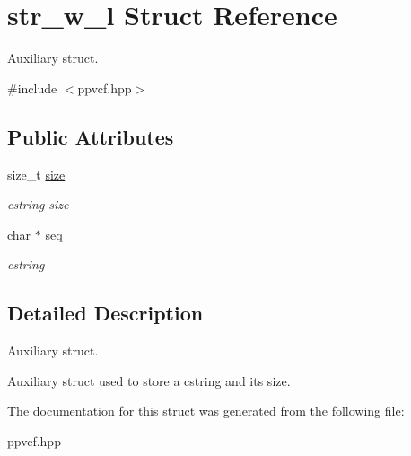 \hypertarget{structstr__w__l}{}\section{str\+\_\+w\+\_\+l Struct Reference}
\label{structstr__w__l}


Auxiliary struct.  




{\ttfamily \#include $<$ppvcf.\+hpp$>$}

\subsection*{Public Attributes}
\begin{DoxyCompactItemize}
\item 
\mbox{\label{structstr__w__l_afde6b57845c40c7291463c48d21fa851}} 
size\+\_\+t \mbox{\hyperlink{structstr__w__l_afde6b57845c40c7291463c48d21fa851}{size}}
\begin{DoxyCompactList}\small\item\em cstring size \end{DoxyCompactList}\item 
\mbox{\label{structstr__w__l_a5d114757e65d5e25e89c5ecc86700d1e}} 
char $\ast$ \mbox{\hyperlink{structstr__w__l_a5d114757e65d5e25e89c5ecc86700d1e}{seq}}
\begin{DoxyCompactList}\small\item\em cstring \end{DoxyCompactList}\end{DoxyCompactItemize}


\subsection{Detailed Description}
Auxiliary struct. 

Auxiliary struct used to store a cstring and its size. 

The documentation for this struct was generated from the following file\+:\begin{DoxyCompactItemize}
\item 
ppvcf.\+hpp\end{DoxyCompactItemize}
